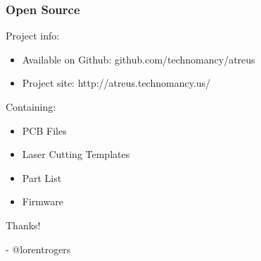 \documentclass{beamer}
\begin{document}
\begin{frame}
  \frametitle{Open Source}
  Project info:
  \begin{itemize}
    \item Available on Github: github.com/technomancy/atreus
    \item Project site: http://atreus.technomancy.us/
  \end{itemize}
  Containing:
  \begin{itemize}
    \item PCB Files
    \item Laser Cutting Templates
    \item Part List
    \item Firmware
  \end{itemize}
\end{frame}

\begin{frame}
  Thanks!

  - @lorentrogers
\end{frame}







\end{document}
